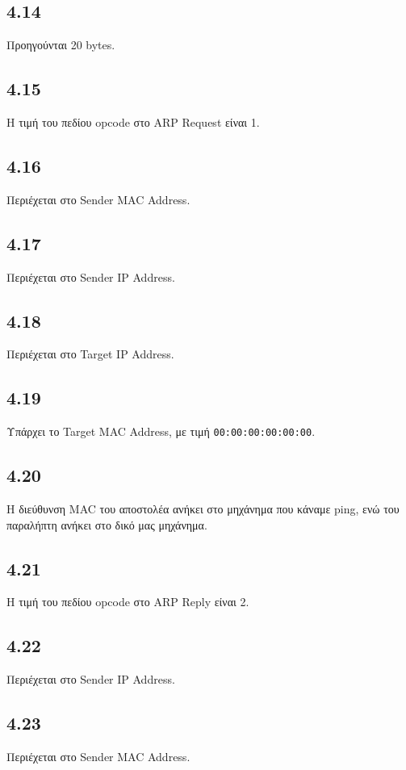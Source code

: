 		\subsection*{4.14}
			Προηγούνται 20 bytes.
		
		\subsection*{4.15}
			Η τιμή του πεδίου opcode στο ARP Request είναι 1.
		
		\subsection*{4.16}
			Περιέχεται στο Sender MAC Address.
		
		\subsection*{4.17}
			Περιέχεται στο Sender IP Address.
		
		\subsection*{4.18}
			Περιέχεται στο Target IP Address.
		
		\subsection*{4.19}
			Υπάρχει το Target MAC Address, με τιμή \verb|00:00:00:00:00:00|.
		
		\subsection*{4.20}
			Η διεύθυνση MAC του αποστολέα ανήκει στο μηχάνημα που κάναμε ping, ενώ του παραλήπτη ανήκει στο δικό μας μηχάνημα.
		
		\subsection*{4.21}
			Η τιμή του πεδίου opcode στο ARP Reply είναι 2.
		
		\subsection*{4.22}
			Περιέχεται στο Sender IP Address.
		
		\subsection*{4.23}
			Περιέχεται στο Sender MAC Address.
		
